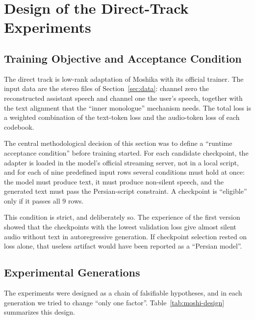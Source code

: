 \section{Design of the Direct-Track Experiments}
\label{sec:direct}

\subsection{Training Objective and Acceptance Condition}

The direct track is low-rank adaptation of Moshika with its official trainer. The input
data are the stereo files of Section~\ref{sec:data}: channel zero the reconstructed
assistant speech and channel one the user's speech, together with the text alignment
that the ``inner monologue'' mechanism needs. The total loss is a weighted combination
of the text-token loss and the audio-token loss of each codebook.

The central methodological decision of this section was to define a ``runtime
acceptance condition'' before training started. For each candidate checkpoint, the
adapter is loaded in the model's official streaming server, not in a local script, and
for each of nine predefined input rows several conditions must hold at once: the model
must produce text, it must produce non-silent speech, and the generated text must pass
the Persian-script constraint. A checkpoint is ``eligible'' only if it passes all 9
rows.

This condition is strict, and deliberately so. The experience of the first version
showed that the checkpoints with the lowest validation loss give almost silent audio
without text in autoregressive generation. If checkpoint selection rested on loss
alone, that useless artifact would have been reported as a ``Persian model''.

\subsection{Experimental Generations}

The experiments were designed as a chain of falsifiable hypotheses, and in each
generation we tried to change ``only one factor''. Table~\ref{tab:moshi-design}
summarizes this design.

